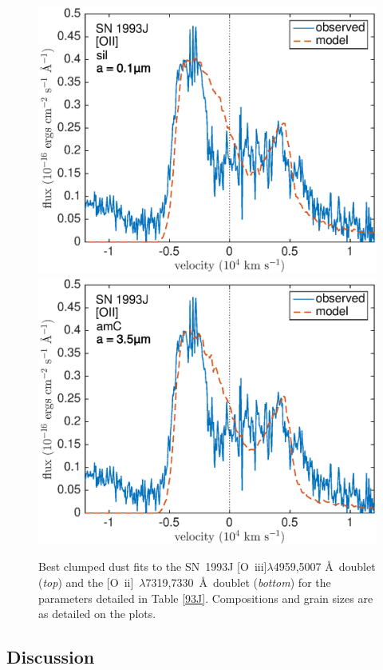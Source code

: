 \begin{figure}
\includegraphics[scale=0.4,clip=true, trim=0 0 40 20]{chapters/chapter6/figs/93J/clumped/OII_sil}
\includegraphics[scale=0.4,clip=true, trim=30 0 40 20]{chapters/chapter6/figs/93J/clumped/OII_amC}
\caption{Best clumped dust fits to the SN~1993J [O~{\sc iii}]$\lambda$4959,5007 \AA\ doublet ({\em top}) and the [O~{\sc ii}]~$\lambda$7319,7330~\AA\ doublet  ({\em bottom}) for the parameters detailed in Table \ref{93J}.  Compositions and grain sizes are as detailed on the plots.}
\label{93J_clumped}
\end{figure}

\subsection{Discussion}
\label{scn:discuss}

